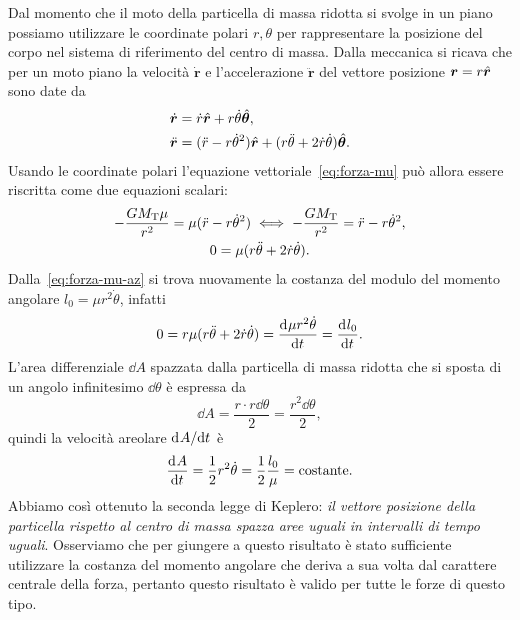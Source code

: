 Dal momento che il moto della particella di massa ridotta si svolge in un piano
possiamo utilizzare le coordinate polari $r,\theta$ per rappresentare la
posizione del corpo nel sistema di riferimento del centro di massa. Dalla
meccanica si ricava che per un moto piano la velocità $\dot{\bm{r}}$ e
l'accelerazione $\ddot{\bm{r}}$ del vettore posizione $\bm{r}=r\hat{\bm{r}}$ sono
date da
\begin{subequations}
  \begin{align} %
    \dot{\bm{r}}  &= \dot{r}\versor{r} +
    r\dot{\theta}\versor{\theta}, \label{eq:velocita-polare}\\
    \ddot{\bm{r}} &= (\ddot{r}-r\dot{\theta}^2)\versor{r} + (r\ddot{\theta} +
    2\dot{r}\dot{\theta}) \versor{\theta}.
  \end{align}
\end{subequations}
Usando le coordinate polari l'equazione vettoriale~\eqref{eq:forza-mu} può
allora essere riscritta come due equazioni scalari:
\begin{subequations}
  \begin{gather}
    -\frac{GM_\textup{T}\mu}{r^2} = \mu(\ddot{r} - r\dot{\theta}^2) \iff
    -\frac{GM_\textup{T}}{r^2}=\ddot{r}-r\dot{\theta}^2, \label{eq:forza-mu-r}\\
    0 = \mu(r\ddot{\theta} + 2\dot{r}\dot{\theta}). \label{eq:forza-mu-az}
  \end{gather}
\end{subequations}
Dalla~\eqref{eq:forza-mu-az} si trova nuovamente la costanza del modulo del
momento angolare $l_0 = \mu r^2\dot{\theta}$, infatti
\begin{equation}
  0 = r\mu(r\ddot{\theta} + 2\dot{r}\dot{\theta}) = \frac{{\mathop{}\!\mathrm{d}^{}}\mu
    r^2\dot{\theta}}{\mathop{}\!\mathrm{d} {t}^{}} = \frac{{\mathop{}\!\mathrm{d}^{}}l_0}{\mathop{}\!\mathrm{d} {t}^{}}.
\end{equation}
L'area differenziale $\dd A$ spazzata dalla particella di massa ridotta che si
sposta di un angolo infinitesimo $\dd\theta$ è espressa da
\begin{equation}
  \dd A = \frac{r\cdot r\dd\theta}{2} = \frac{r^2\dd\theta}{2},
\end{equation}
quindi la velocità areolare $\mathrm{d}^{}A / \mathrm{d} {t}^{}$ è
\begin{equation}
  \frac{{\mathop{}\!\mathrm{d}^{}}A}{\mathop{}\!\mathrm{d} {t}^{}} = \frac{1}{2}r^2\dot{\theta} = \frac{1}{2}\frac{l_0}{\mu} =
  \text{costante}.
\end{equation}
Abbiamo così ottenuto la seconda legge di Keplero: \emph{il vettore posizione
  della particella rispetto al centro di massa spazza aree uguali in intervalli
  di tempo uguali}. Osserviamo che per giungere a questo risultato è stato
sufficiente utilizzare la costanza del momento angolare che deriva a sua volta
dal carattere centrale della forza, pertanto questo risultato è valido per tutte
le forze di questo tipo.

